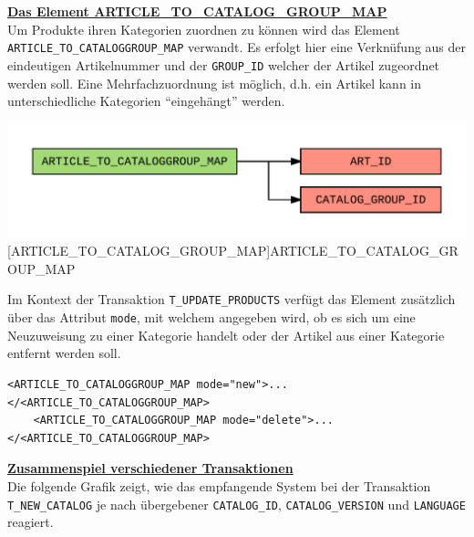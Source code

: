 	
	\textbf{\underline{Das Element ARTICLE\_TO\_CATALOG\_GROUP\_MAP}}\\
	
	Um Produkte ihren Kategorien zuordnen zu können wird das Element \texttt{ARTICLE\_TO\_CATALOGGROUP\_MAP} verwandt. Es erfolgt hier eine Verknüfung aus der eindeutigen Artikelnummer und der \texttt{GROUP\_ID} welcher der Artikel zugeordnet werden soll. Eine Mehrfachzuordnung ist möglich, d.h. ein Artikel kann in unterschiedliche Kategorien \enquote{eingehängt} werden.
	
	\begin{minipage}{\linewidth}
		\vspace{1em}
		\centering
		\includegraphics[width=0.7\linewidth]{img/articleGroupMap}
		[ARTICLE\_TO\_CATALOG\_GROUP\_MAP]{ARTICLE\_TO\_CATALOG\_GROUP\_MAP}
		\label{fig:header}
		\vspace{1em}
	\end{minipage}
	
	Im Kontext der Transaktion \texttt{T\_UPDATE\_PRODUCTS} verfügt das Element zusätzlich über das Attribut \texttt{mode}, mit welchem angegeben wird, ob es sich um eine Neuzuweisung zu einer Kategorie handelt oder der Artikel aus einer Kategorie entfernt werden soll.
	
	\begin{lstlisting}[caption={Modi des Elementes ARTICLE\_TO\_CATALOGGROUP\_MAP }] 
	<ARTICLE_TO_CATALOGGROUP_MAP mode="new">...</<ARTICLE_TO_CATALOGGROUP_MAP>
	<ARTICLE_TO_CATALOGGROUP_MAP mode="delete">...</<ARTICLE_TO_CATALOGGROUP_MAP>
	\end{lstlisting}
	
	
	\textbf{\underline{Zusammenspiel verschiedener Transaktionen}}\\
	
	Die folgende Grafik zeigt, wie das empfangende System bei der Transaktion \texttt{T\_NEW\_CATALOG} je nach übergebener \texttt{CATALOG\_ID}, \texttt{CATALOG\_VERSION} und \texttt{LANGUAGE} reagiert.
	
